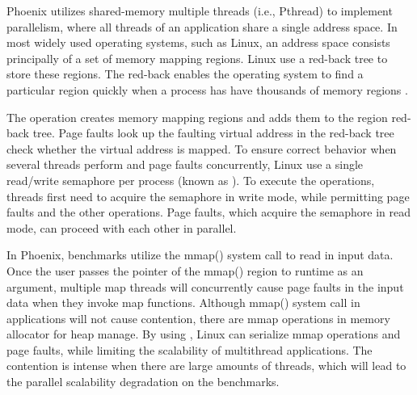 
Phoenix utilizes shared-memory multiple threads (i.e., Pthread) to implement parallelism, where all threads of an application share a single address space.
In most widely used operating systems, such as Linux, an address space consists principally of a set of memory mapping regions.
Linux use a red-back tree to store these regions. 
The red-back enables the operating system to find a particular region quickly when a process has have thousands of memory regions \cite{linux}.


%

The  operation creates memory mapping regions and adds them to the region red-back tree. 
Page faults look up the faulting virtual address in the red-back tree check whether the virtual address is mapped.
To ensure correct behavior when several threads perform  and page faults concurrently, Linux use a single read/write semaphore per process (known as ).
To execute the  operations, threads first need to acquire the semaphore in write mode, while permitting page faults and the other  operations.
Page faults, which acquire the semaphore in read mode, can proceed with each other in parallel. 


In Phoenix, benchmarks utilize the mmap() system call to read in input data. 
Once the user passes the pointer of the mmap() region to runtime as an argument, multiple map threads will concurrently cause page faults in the input data when they invoke map functions.
Although mmap() system call in applications will not cause contention,
there are mmap operations in memory allocator for heap manage.
By using , Linux can serialize mmap operations and page faults, while limiting the scalability of multithread applications.
The contention is intense when there are large amounts of threads,
which will lead to the parallel scalability degradation on the benchmarks.
 
